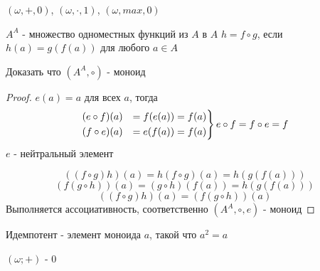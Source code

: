\documentclass[../main/document.tex]{subfiles}
\begin{document}
\begin{exm}

$(\omega,+,0)$, $(\omega,\cdot,1)$, $(\omega,max,0)$

$A^A$ - множество одноместных функций из $A$ в $A$
$h=f\circ g$, если $h(a)=g(f(a))$ для любого $a\in A$

Доказать что $(A^A,\circ)$ - моноид
\begin{proof}
$e(a)=a$ для всех $a$, тогда
\begin{equation*}
\begin{rcases}
(e\circ f)(a) &= f(e(a))= f(a) \\
(f\circ e)(a) &= e(f(a))= f(a) 
\end{rcases}
e\circ f=f\circ e=f
\end{equation*}
$e$ - нейтральный элемент

$$((f\circ g)h)(a)=h(f\circ g)(a)=h(g(f(a)))$$
$$(f(g\circ h))(a)=(g\circ h)(f(a))=h(g(f(a)))$$
$$((f\circ g)h)(a)=(f(g\circ h))(a)$$
Выполняется ассоциативность, соответственно $(A^A,\circ,e)$ - моноид

\end{proof}
\end{exm}
\begin{dfn}[Идемпотент]
Идемпотент - элемент моноида $a$, такой что $a^2=a$
\end{dfn}

\begin{exm}
$(\omega;+)$ - $0$
\end{exm}
\end{document}
